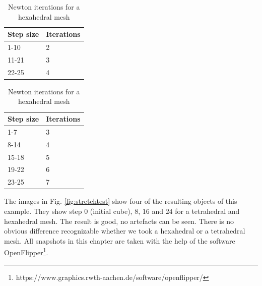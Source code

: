 \begin{table}[!htbp]
\parbox{.45\linewidth}{
\centering
\begin{tabular}{ | l | l |}
\hline
\textbf{Step size} & \textbf{Iterations} \\ \hline
1-10 & 2 \\ \hline
11-21 & 3 \\ \hline
22-25 & 4 \\ \hline
\end{tabular}
\caption{Newton iterations for a tetrahedral mesh}
\label{table:default_tet}
}
\hfill
\parbox{.45\linewidth}{
\centering
\begin{tabular}{ | l | l |}
\hline
\textbf{Step size} & \textbf{Iterations} \\ \hline
1-7 & 3 \\ \hline
8-14 & 4 \\ \hline
15-18 & 5 \\ \hline
19-22 & 6 \\ \hline
23-25 & 7 \\ \hline
\end{tabular}
\caption{Newton iterations for a hexahedral mesh}
\label{table:default_hex}
}
\end{table}

The images in Fig. \ref{fig:stretchtest} show four of the resulting objects of this example. They show step $0$ (initial cube), $8$, $16$ and $24$ for a tetrahedral and hexahedral mesh. The result is good, no artefacts can be seen. There is no obvious difference recognizable whether we took a hexahedral or a tetrahedral mesh. All snapshots in this chapter are taken with the help of the software OpenFlipper\footnote{https://www.graphics.rwth-aachen.de/software/openflipper/}.

